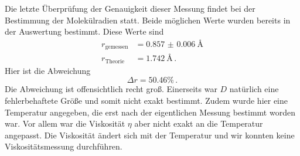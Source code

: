 Die letzte Überprüfung der Genauigkeit dieser Messung findet bei der Bestimmung der Molekülradien statt.
Beide möglichen Werte wurden bereits in der Auswertung bestimmt. 
Diese Werte sind
\begin{align*}
    r_\text{gemessen} &= \SI{0.857(6)}{\angstrom} \\
    r_\text{Theorie} &= \SI{1.742}{\angstrom}  \, .
\end{align*}
Hier ist die Abweichung 
\begin{equation*}
    \Delta r = \num{50.46} \% \, .
\end{equation*}
Die Abweichung ist offensichtlich recht groß.
Einerseits war $D$ natürlich eine fehlerbehaftete Größe und somit nicht exakt bestimmt.
Zudem wurde hier eine Temperatur angegeben, die erst nach der eigentlichen Messung bestimmt worden war.
Vor allem war die Viskosität $\eta$ aber nicht exakt an die Temperatur angepasst. 
Die Viskosität ändert sich mit der Temperatur und wir konnten keine Viskositätsmessung durchführen.
